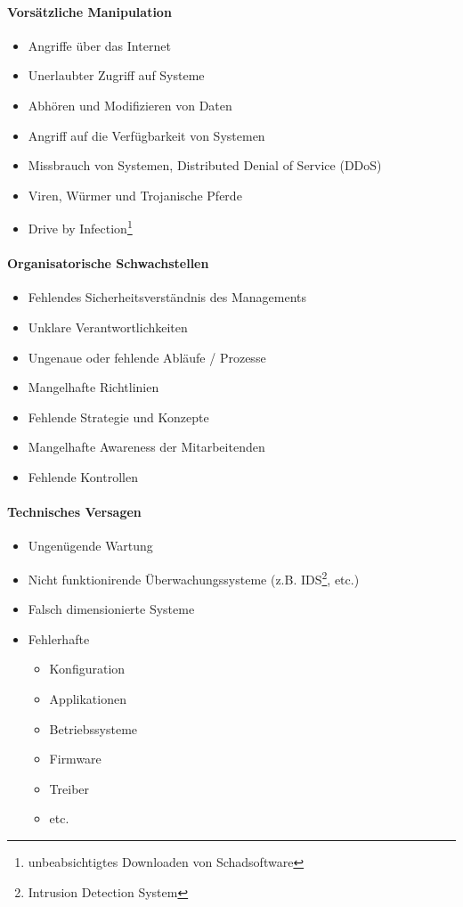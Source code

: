 \documentclass[10pt,a4paper]{article}
\begin{document}
\paragraph*{Vorsätzliche Manipulation}
\begin{itemize}[noitemsep,topsep=0pt,leftmargin=*]
    \item Angriffe über das Internet
    \item Unerlaubter Zugriff auf Systeme
    \item Abhören und Modifizieren von Daten
    \item Angriff auf die Verfügbarkeit von Systemen
    \item Missbrauch von Systemen, Distributed Denial of Service (DDoS)
    \item Viren, Würmer und Trojanische Pferde
    \item Drive by Infection\footnote{unbeabsichtigtes Downloaden von Schadsoftware}
\end{itemize}

\paragraph*{Organisatorische Schwachstellen}
\begin{itemize}[noitemsep,topsep=0pt,leftmargin=*]
    \item Fehlendes Sicherheitsverständnis des Managements
    \item Unklare Verantwortlichkeiten
    \item Ungenaue oder fehlende Abläufe / Prozesse
    \item Mangelhafte Richtlinien
    \item Fehlende Strategie und Konzepte
    \item Mangelhafte Awareness der Mitarbeitenden
    \item Fehlende Kontrollen
\end{itemize}

\paragraph*{Technisches Versagen}
\begin{itemize}[noitemsep,topsep=0pt,leftmargin=*]
    \item Ungenügende Wartung
    \item Nicht funktionirende Überwachungssysteme (z.B. IDS\footnote{Intrusion Detection System}, etc.)
    \item Falsch dimensionierte Systeme
    \item Fehlerhafte
    \begin{itemize}[noitemsep,topsep=0pt,leftmargin=*]
        \item Konfiguration
        \item Applikationen
        \item Betriebssysteme
        \item Firmware
        \item Treiber
        \item etc.
    \end{itemize}
\end{itemize}
\end{document}
